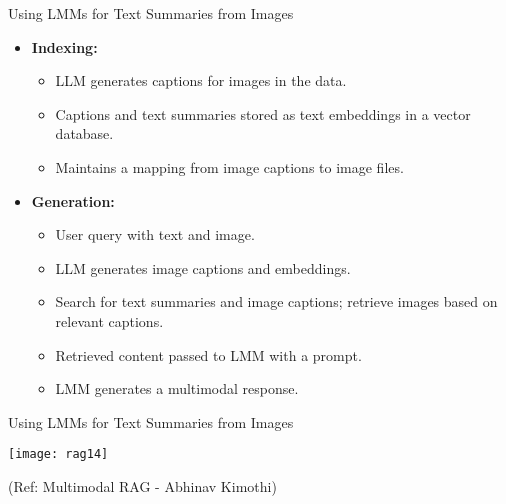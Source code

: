 \begin{frame}[fragile]{Using LMMs for Text Summaries from Images}
    \begin{itemize}
        \item \textbf{Indexing:}
            \begin{itemize}
                \item LLM generates captions for images in the data.
                \item Captions and text summaries stored as text embeddings in a vector database.
                \item Maintains a mapping from image captions to image files.
            \end{itemize}
        \item \textbf{Generation:}
            \begin{itemize}
                \item User query with text and image.
                \item LLM generates image captions and embeddings.
                \item Search for text summaries and image captions; retrieve images based on relevant captions.
                \item Retrieved content passed to LMM with a prompt.
                \item LMM generates a multimodal response.
            \end{itemize}
    \end{itemize}
\end{frame}

\begin{frame}[fragile]{Using LMMs for Text Summaries from Images}


		\begin{center}
		\texttt{[image: rag14]}
		\end{center}

{\tiny (Ref: Multimodal RAG - Abhinav  Kimothi)}

\end{frame}
